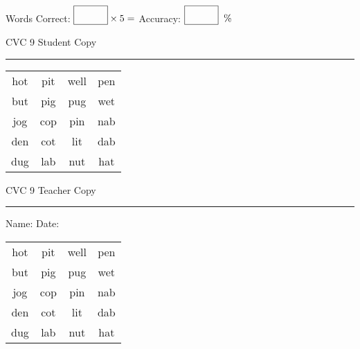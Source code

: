 \documentclass{memoir}
\begin{document}
\small

Words Correct: $\fbox{\phantom{\huge 100}} \times 5 = $ Accuracy: $\fbox{\phantom{\huge 100}}\;\; \%$ 

\vfill

\newpage


\footnotesize \noindent
CVC 9 \hfill Student Copy
\smallskip
\hrule

\Large

\setlength{\tabcolsep}{14pt}
\def\arraystretch{2}

{\selectfont


\begin{vplace}[0.5]
\begin{center}
\begin{tabular}{cccc}
hot & pit & well & pen \\
but & pig & pug & wet \\
jog & cop & pin & nab \\
den & cot & lit & dab \\
dug & lab & nut & hat \\
\end{tabular}
\end{center}
\end{vplace}

}

\newpage

\footnotesize \noindent
CVC 9 \hfill Teacher Copy
\smallskip
\hrule

\small

\vfill

\noindent
Name: \underline{\hspace{1.75in}} \hfill Date: \underline{\hspace{1in}}

\Large

{\selectfont


\begin{vplace}[0.5]
\begin{center}
\begin{tabular}{cccc}
hot & pit & well & pen \\
but & pig & pug & wet \\
jog & cop & pin & nab \\
den & cot & lit & dab \\
dug & lab & nut & hat \\
\end{tabular}
\end{center}
\end{vplace}



}
\end{document}
